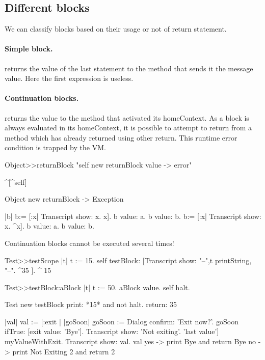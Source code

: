 \documentclass[a4paper,10pt,twoside]{book}
\begin{document}
\subsection{Different blocks} 

We can classify blocks based on their usage or not of return statement. 

\paragraph{Simple block.} \ct{[:x :y| x*x. x+y]} returns the value of the last statement to the method that sends it the message value. Here the first expression is useless.

\paragraph{Continuation blocks.} \ct{[:x :y| x*x. ^ x + y]} returns the value to the method that activated its homeContext. As a block is always evaluated in its homeContext, it is possible to attempt to return from a method which has already returned using other return. This runtime error condition is trapped by the VM.

\begin{code}{}
Object>>returnBlock
	"self new returnBlock value -> error"

	^[^self]

Object new returnBlock
-> Exception
\end{code}	
	
	
\begin{code}{}
|b| 
b:= [:x| Transcript show: x. x].
b value: a. b value: b.
b:= [:x| Transcript show: x. ^x].
b value: a. b value: b.
\end{code}
 
Continuation blocks cannot be executed several times!

\begin{code}{}
Test>>testScope
	   |t|
    	t := 15.
	   self testBlock: [Transcript show: "--",t printString, "--".
	   ^35 ].
    ^ 15

Test>>testBlock:aBlock
	   |t|
	   t := 50.
	   aBlock value.
	   self halt.
\end{code}

\begin{code}{}
Test new testBlock 	
print: *15* and not halt. 
return: 35
\end{code}


\begin{code}{}
|val|
val := [:exit |
		|goSoon|
		goSoon := Dialog confirm: 'Exit now?'.
		goSoon ifTrue: [exit value: 'Bye'].
		Transcript show: 'Not exiting'.
		'last value'] myValueWithExit.
Transcript show: val.
val
yes -> print Bye and return  Bye
no -> print Not Exiting 2 and return 2
\end{code}
\end{document}

